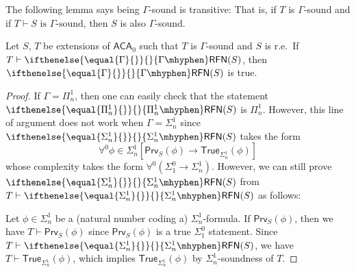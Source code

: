 \documentclass{mhkr}
\newcommand{\Prv}{\mathsf{Prv}}
\newcommand{\True}{\mathsf{True}}
\newcommand{\RFN}[1][]{\ifthenelse{\equal{#1}{}}{}{#1\mhyphen}\mathsf{RFN}}
\newcommand{\ACA}{\mathsf{ACA}}
\begin{document}
The following lemma says being $\Gamma$-sound is transitive: That is, if $T$ is $\Gamma$-sound and if $T\vdash \text{$S$ is $\Gamma$-sound}$, then $S$ is also $\Gamma$-sound.
\begin{lemma}[$\ACA_0$] \label{Lemma: Transitivity of Gamma-soundness for r.e. theories}
    Let $S$, $T$ be extensions of $\ACA_0$ such that $T$ is $\Gamma$-sound and $S$ is r.e.\
    If $T\vdash \RFN[\Gamma](S)$, then $\RFN[\Gamma](S)$ is true.
\end{lemma}
\begin{proof}
    If $\Gamma = \Pi^1_n$, then one can easily check that the statement $\RFN[\Pi^1_n](S)$ is $\Pi^1_n$. However, this line of argument does not work when $\Gamma=\Sigma^1_n$ since $\RFN[\Sigma^1_n](S)$ takes the form
    \begin{equation*}
        \forall^0 \phi\in \Sigma^1_n [\Prv_S(\phi) \to \True_{\Sigma^1_n}(\phi)]
    \end{equation*}
    whose complexity takes the form $\forall^0 (\Sigma^0_1\to \Sigma^1_n)$. However, we can still prove $\RFN[\Sigma^1_n](S)$ from $T\vdash \RFN[\Sigma^1_n](S)$ as follows:

    Let $\phi\in \Sigma^1_n$ be a (natural number coding a) $\Sigma^1_n$-formula. If $\Prv_S(\phi)$, then we have $T\vdash \Prv_S(\phi)$ since $\Prv_S(\phi)$ is a true $\Sigma^0_1$ statement. Since $T\vdash \RFN[\Sigma^1_n](S)$, we have $T\vdash \True_{\Sigma^1_n}(\phi)$, which implies $\True_{\Sigma^1_n}(\phi)$ by $\Sigma^1_n$-soundness of $T$.
\end{proof}
\end{document}
